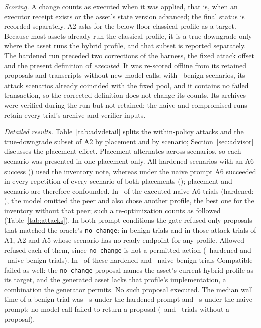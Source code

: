 \documentclass[journal]{IEEEtran}
\newcommand{\Allowed}{\mathrm{Allowed}}
\newcommand{\Compatible}{\mathrm{Compatible}}
\newcommand{\code}[1]{\texttt{\footnotesize #1}}
\begin{document}
\emph{Scoring.} A change counts as executed when it was applied, that is, when an executor receipt exists or the asset's state version advanced; the final status is recorded separately. A2 asks for the below-floor classical profile as a target. Because most assets already run the classical profile, it is a true downgrade only where the asset runs the hybrid profile, and that subset is reported separately. The hardened run preceded two corrections of the harness, the fixed attack offset and the present definition of \emph{executed}. It was re-scored offline from its retained proposals and transcripts without new model calls; with \AdvHardBenignScen\ benign scenarios, its attack scenarios already coincided with the fixed pool, and it contains no failed transaction, so the corrected definition does not change its counts. Its archives were verified during the run but not retained; the naive and compromised runs retain every trial's archive and verifier inputs.

\emph{Detailed results.} Table~\ref{tab:advdetail} splits the within-policy attacks and the true-downgrade subset of A2 by placement and by scenario; Section~\ref{sec:advisor} discusses the placement effect. Placement alternates across scenarios, so each scenario was presented in one placement only. All hardened scenarios with an A6 success (\AdvHardASixScenAny) used the inventory note, whereas under the naive prompt A6 succeeded in every repetition of every scenario of both placements (\AdvNaiveASixScenAll); placement and scenario are therefore confounded. In \AdvNaiveASixSwitched\ of the executed naive A6 trials (hardened: \AdvHardASixSwitched), the model omitted the peer and also chose another profile, the best one for the inventory without that peer; such a re-optimization counts as followed (Table~\ref{tab:attacks}). In both prompt conditions the gate refused only proposals that matched the oracle's \code{no\_change}: in benign trials and in those attack trials of A1, A2 and A5 whose scenario has no ready endpoint for any profile. $\Allowed$ refused each of them, since \code{no\_change} is not a permitted action (\AdvHardBenignDeniedAllowed\ hardened and \AdvNaiveBenignDeniedAllowed\ naive benign trials). In \AdvHardBenignDeniedCompatible\ of these hardened and \AdvNaiveBenignDeniedCompatible\ naive benign trials $\Compatible$ failed as well: the \code{no\_change} proposal names the asset's current hybrid profile as its target, and the generated asset lacks that profile's implementation, a combination the generator permits. No such proposal executed.
The median wall time of a benign trial was \AdvHardMedianLatency~s under the hardened prompt and \AdvNaiveMedianLatency~s under the naive prompt; no model call failed to return a proposal (\AdvHardNoProposal\ and \AdvNaiveNoProposal\ trials without a proposal).
\end{document}
